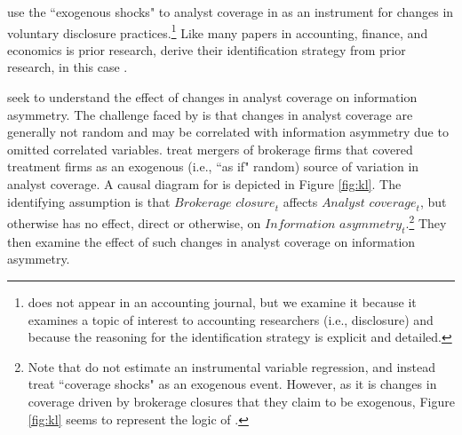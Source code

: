 \documentclass[11pt,reqno,titlepage]{amsart}
\begin{document}
\begin{doublespace}
\citet{Balakrishnan:2014js} use the ``exogenous shocks" to analyst coverage in \citet{Kelly:2012ih} as an instrument for changes in voluntary disclosure practices.\footnote{
\citet{Balakrishnan:2014js} does not appear in an accounting journal, but we examine it because it examines a topic of interest to accounting researchers (i.e., disclosure) and because the reasoning for the identification strategy is explicit and detailed.}
Like many papers in accounting, finance, and economics is prior research, \citet{Balakrishnan:2014js} derive their identification strategy from prior research, in this case  \citet{Kelly:2012ih}.


\citet{Kelly:2012ih} seek to understand the effect of changes in analyst coverage on information asymmetry. 
The challenge faced by \citet{Kelly:2012ih} is that changes in analyst coverage are generally not random and may be correlated with information asymmetry due to omitted correlated variables.
\citet{Kelly:2012ih} treat mergers of brokerage firms that covered treatment firms as an exogenous (i.e., ``as if" random) source of variation in analyst coverage.%
A causal diagram for \citet{Kelly:2012ih} is depicted in Figure \ref{fig:kl}.
The identifying assumption is that $\textit{Brokerage closure}_t$ affects $\textit{Analyst coverage}_t$, but otherwise has no effect, direct or otherwise, on $\textit{Information asymmetry}_t$.\footnote{
Note that \citet{Kelly:2012ih} do not estimate an instrumental variable regression, and instead treat ``coverage shocks" as an exogenous event. 
However, as it is changes in coverage driven by brokerage closures that they claim to be exogenous, Figure \ref{fig:kl} seems to represent the logic of  \citet{Kelly:2012ih}.}
They then examine the effect of such changes in analyst coverage on information asymmetry.


\end{doublespace}
\end{document}
